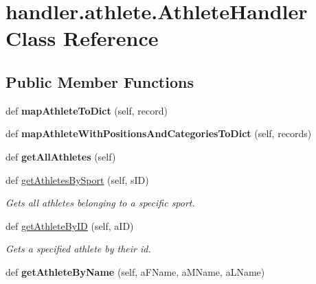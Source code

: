 \hypertarget{classhandler_1_1athlete_1_1_athlete_handler}{}\section{handler.\+athlete.\+Athlete\+Handler Class Reference}
\label{classhandler_1_1athlete_1_1_athlete_handler}
\subsection*{Public Member Functions}
\begin{DoxyCompactItemize}
\item 
\mbox{\label{classhandler_1_1athlete_1_1_athlete_handler_a953b9be16453dce8e25f08d2c53413f0}} 
def {\bfseries map\+Athlete\+To\+Dict} (self, record)
\item 
\mbox{\label{classhandler_1_1athlete_1_1_athlete_handler_a53d7b2d7abc4fe899194f146763d3287}} 
def {\bfseries map\+Athlete\+With\+Positions\+And\+Categories\+To\+Dict} (self, records)
\item 
\mbox{\label{classhandler_1_1athlete_1_1_athlete_handler_aae7ac6fee7495a16818e09a8946ead32}} 
def {\bfseries get\+All\+Athletes} (self)
\item 
def \hyperlink{classhandler_1_1athlete_1_1_athlete_handler_af33bd416854d51f10a33aa264f1e3b2f}{get\+Athletes\+By\+Sport} (self, s\+ID)
\begin{DoxyCompactList}\small\item\em Gets all athletes belonging to a specific sport. \end{DoxyCompactList}\item 
def \hyperlink{classhandler_1_1athlete_1_1_athlete_handler_a7261ed3d7231ef7bdb261863414be608}{get\+Athlete\+By\+ID} (self, a\+ID)
\begin{DoxyCompactList}\small\item\em Gets a specified athlete by their id. \end{DoxyCompactList}\item 
\mbox{\label{classhandler_1_1athlete_1_1_athlete_handler_ae32bb30286d76da5e4b5d17e211ce80b}} 
def {\bfseries get\+Athlete\+By\+Name} (self, a\+F\+Name, a\+M\+Name, a\+L\+Name)

\end{DoxyCompactItemize}
